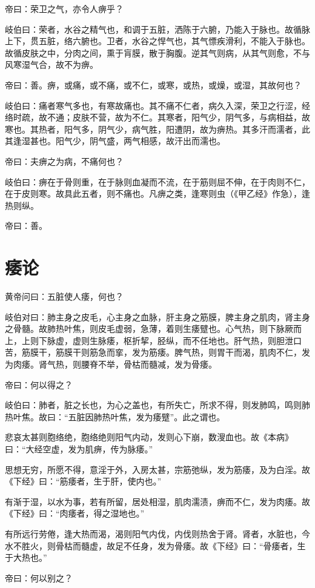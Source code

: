 \documentclass{article}%
\begin{document}
帝曰：荣卫之气，亦令人痹乎？

岐伯曰：荣者，水谷之精气也，和调于五脏，洒陈于六腑，乃能入于脉也。故循脉上下，贯五脏，络六腑也。卫者，水谷之悍气也，其气慓疾滑利，不能入于脉也。故循皮肤之中，分肉之间，熏于肓膜，散于胸腹。逆其气则病，从其气则愈，不与风寒湿气合，故不为痹。

帝曰：善。痹，或痛，或不痛，或不仁，或寒，或热，或燥，或湿，其故何也？

岐伯曰：痛者寒气多也，有寒故痛也。其不痛不仁者，病久入深，荣卫之行涩，经络时疏，故不通；皮肤不营，故为不仁。其寒者，阳气少，阴气多，与病相益，故寒也。其热者，阳气多，阴气少，病气胜，阳遭阴，故为痹热。其多汗而濡者，此其逢湿甚也。阳气少，阴气盛，两气相感，故汗出而濡也。

帝曰：夫痹之为病，不痛何也？

岐伯曰：痹在于骨则重，在于脉则血凝而不流，在于筋则屈不伸，在于肉则不仁，在于皮则寒。故具此五者，则不痛也。凡痹之类，逢寒则虫（《甲乙经》作急），逢热则纵。

帝曰：善。
\section{痿论}
黄帝问曰：五脏使人痿，何也？

岐伯对曰：肺主身之皮毛，心主身之血脉，肝主身之筋膜，脾主身之肌肉，肾主身之骨髓。故肺热叶焦，则皮毛虚弱，急薄，着则生痿躄也。心气热，则下脉厥而上，上则下脉虚，虚则生脉痿，枢折挈，胫纵，而不任地也。肝气热，则胆泄口苦，筋膜干，筋膜干则筋急而挛，发为筋痿。脾气热，则胃干而渴，肌肉不仁，发为肉痿。肾气热，则腰脊不举，骨枯而髓减，发为骨痿。

帝曰：何以得之？

岐伯曰：肺者，脏之长也，为心之盖也，有所失亡，所求不得，则发肺鸣，鸣则肺热叶焦。故曰：“五脏因肺热叶焦，发为痿躄”。此之谓也。

悲哀太甚则胞络绝，胞络绝则阳气内动，发则心下崩，数溲血也。故《本病》曰：“大经空虚，发为肌痹，传为脉痿。”

思想无穷，所愿不得，意淫于外，入房太甚，宗筋弛纵，发为筋痿，及为白淫。故《下经》曰：“筋痿者，生于肝，使内也。”

有渐于湿，以水为事，若有所留，居处相湿，肌肉濡渍，痹而不仁，发为肉痿。故《下经》曰：“肉痿者，得之湿地也。”

有所远行劳倦，逢大热而渴，渴则阳气内伐，内伐则热舍于肾。肾者，水脏也，今水不胜火，则骨枯而髓虚，故足不任身，发为骨痿。故《下经》曰：“骨痿者，生于大热也。”

帝曰：何以别之？
\end{document}
